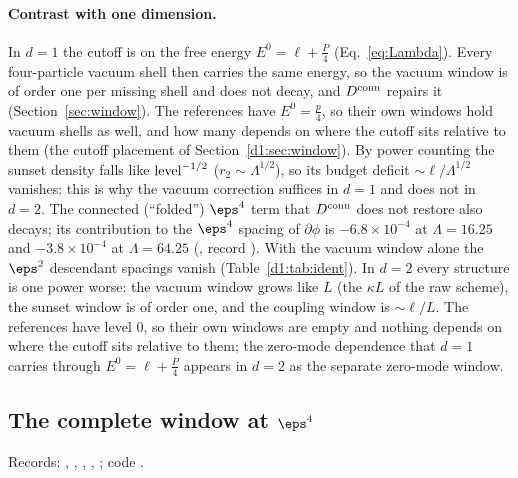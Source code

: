 \paragraph{Contrast with one dimension.} In $d=1$ the cutoff is on the free energy $E^0=\ell+\frac P4$
(Eq.~\eqref{eq:Lambda}). Every four-particle vacuum shell then carries the same energy, so the vacuum window is of order one
per missing shell and does not decay, and $D^{\rm conn}$ repairs it (Section~\ref{sec:window}). The references have
$E^0=\frac p4$, so their own windows hold vacuum shells as well, and how many depends on where the cutoff sits relative to
them (the cutoff placement of Section~\ref{d1:sec:window}). By power counting the sunset density falls like
${\rm level}^{-1/2}$ ($r_2\sim\Lambda^{1/2}$), so its budget deficit ${\sim}\ell/\Lambda^{1/2}$ vanishes: this is why the
vacuum correction suffices in $d=1$ and does not in $d=2$. The connected (``folded'') $\eps^4$ term that $D^{\rm conn}$ does
not restore also decays; its contribution to the $\eps^4$ spacing of $\partial\phi$ is $-6.8\times10^{-4}$ at
$\Lambda=16.25$ and $-3.8\times10^{-4}$ at $\Lambda=64.25$ (, record
). With the
vacuum window alone the $\eps^2$ descendant spacings vanish (Table~\ref{d1:tab:ident}). In $d=2$ every structure is one
power worse: the vacuum window grows like $L$ (the $\kappa L$ of the raw scheme), the sunset window is of order one, and the
coupling window is ${\sim}\ell/L$. The references have level 0, so their own windows are empty and nothing depends on where
the cutoff sits relative to them; the zero-mode dependence that $d=1$ carries through $E^0=\ell+\frac P4$ appears in $d=2$
as the separate zero-mode window.

\subsection{The complete window at \texorpdfstring{$\eps^4$}{eps4}}\label{d2:app:window}
{\small\raggedright\noindent Records: , ,
, ,
; code .\par}

